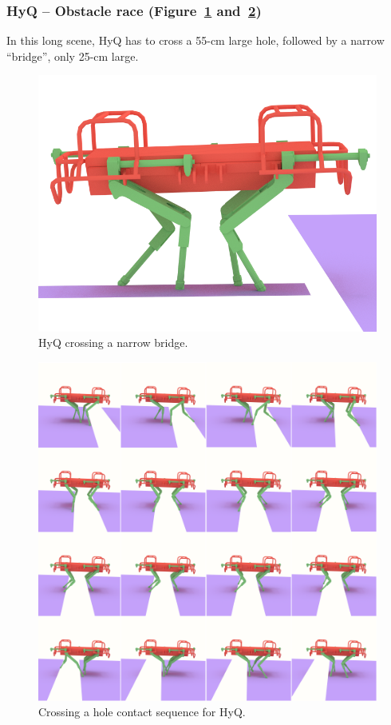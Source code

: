 \documentclass[journal]{IEEEtran}
\begin{document}
\subsubsection{HyQ -- Obstacle race (Figure~\ref{fig:HyQ_bridge} and~\ref{fig:HyQ_obs})}
In this long scene, HyQ has to cross a 55-cm large hole, followed by a narrow ``bridge'', only 25-cm large.

\begin{figure}
  \centering
  \includegraphics[width=0.4\linewidth]{figures/HyQ_bridge}
  \caption{
           HyQ crossing a narrow bridge. }
		   \label{fig:HyQ_bridge}
\end{figure}

\begin{figure}
  \centering
  \includegraphics[width=1\linewidth]{figures/HyQ_obs}
  \caption{
           Crossing a hole contact sequence for HyQ. }
		   \label{fig:HyQ_obs}
\end{figure}
\end{document}
